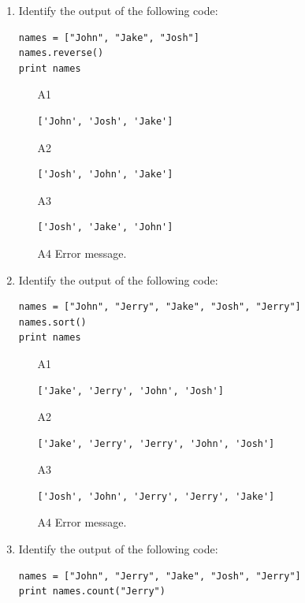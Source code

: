 \begin{enumerate}
\begin{enumerate}
\begin{verbatim}
['Jenny', 'Jake', 'Josh']
\end{verbatim}
\item[A4] Error message.
\end{enumerate}
\item Identify the output of the following code:
\begin{verbatim}
names = ["John", "Jake", "Josh"]
names.reverse()
print names
\end{verbatim}
\begin{enumerate}
\item[A1] 
\begin{verbatim}
['John', 'Josh', 'Jake']
\end{verbatim}
\item[A2] 
\begin{verbatim}
['Josh', 'John', 'Jake']
\end{verbatim}
\item[A3] 
\begin{verbatim}
['Josh', 'Jake', 'John']
\end{verbatim}
\item[A4] Error message.
\end{enumerate}
\item Identify the output of the following code:
\begin{verbatim}
names = ["John", "Jerry", "Jake", "Josh", "Jerry"]
names.sort()
print names
\end{verbatim}
\begin{enumerate}
\item[A1] 
\begin{verbatim}
['Jake', 'Jerry', 'John', 'Josh']
\end{verbatim}
\item[A2] 
\begin{verbatim}
['Jake', 'Jerry', 'Jerry', 'John', 'Josh']
\end{verbatim}
\item[A3] 
\begin{verbatim}
['Josh', 'John', 'Jerry', 'Jerry', 'Jake']
\end{verbatim}
\item[A4] Error message.
\end{enumerate}
\item Identify the output of the following code:
\begin{verbatim}
names = ["John", "Jerry", "Jake", "Josh", "Jerry"]
print names.count("Jerry")
\end{verbatim}

\end{enumerate}
